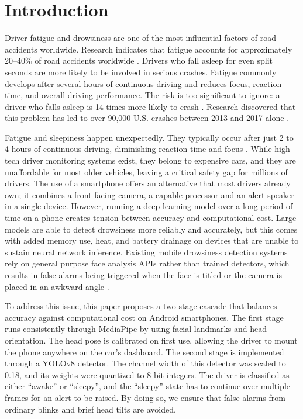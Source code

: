 \documentclass[pdflatex,sn-mathphys-num]{sn-jnl}
\theoremstyle{thmstyleone}%
\theoremstyle{thmstyletwo}%
\theoremstyle{thmstylethree}%
\begin{document}
	\section{Introduction}\label{sec:intro}
	Driver fatigue and drowsiness are one of the most influential factors of road accidents worldwide. Research indicates that fatigue accounts for approximately 20–40\% of road accidents worldwide \cite{bib1, bib2, bib3}. Drivers who fall asleep for even split seconds are more likely to be involved in serious crashes. Fatigue commonly develops after several hours of continuous driving and reduces focus, reaction time, and overall driving performance. The risk is too significant to ignore: a driver who falls asleep is 14 times more likely to crash \cite{bib4}. Research discovered that this problem has led to over 90,000 U.S. crashes between 2013 and 2017 alone \cite{bib5}.
	
	Fatigue and sleepiness happen unexpectedly. They typically occur after just 2 to 4 hours of continuous driving, diminishing reaction time and focus \cite{bib6, bib7, bib8}. While high-tech driver monitoring systems exist, they belong to expensive cars, and they are unaffordable for most older vehicles, leaving a critical safety gap for millions of drivers. The use of a smartphone offers an alternative that most drivers already own; it combines a front-facing camera, a capable processor and an alert speaker in a single device. However, running a deep learning model over a long period of time on a phone creates tension between accuracy and computational cost. Large models are able to detect drowsiness more reliably and accurately, but this comes with added memory use, heat, and battery drainage on devices that are unable to sustain neural network inference. Existing mobile drowsiness detection systems rely on general purpose face analysis APIs rather than trained detectors, which results in false alarms being triggered when the face is titled or the camera is placed in an awkward angle \cite{bib9}.
	
	To address this issue, this paper proposes a two-stage cascade that balances accuracy against computational cost on Android smartphones. The first stage runs consistently through MediaPipe by using facial landmarks and head orientation. The head pose is calibrated on first use, allowing the driver to mount the phone anywhere on the car’s dashboard. The second stage is implemented through a YOLOv8 detector. The channel width of this detector was scaled to 0.18, and its weights were quantized to 8-bit integers. The driver is classified as either “awake” or “sleepy”, and the “sleepy” state has to continue over multiple frames for an alert to be raised. By doing so, we ensure that false alarms from ordinary blinks and brief head tilts are avoided.
	
\end{document}
